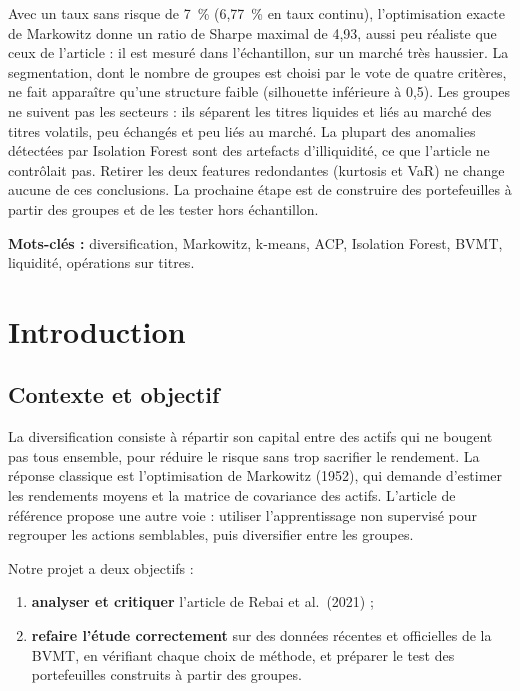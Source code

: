 \documentclass[11pt,a4paper]{article}
\newcommand{\pc}{~\%}
\begin{document}
Avec un taux sans risque de 7\pc{} (6,77\pc{} en taux continu), l'optimisation exacte de Markowitz donne un ratio de Sharpe maximal de 4,93, aussi peu réaliste que ceux de l'article : il est mesuré dans l'échantillon, sur un marché très haussier. La segmentation, dont le nombre de groupes est choisi par le vote de quatre critères, ne fait apparaître qu'une structure faible (silhouette inférieure à 0,5). Les groupes ne suivent pas les secteurs : ils séparent les titres liquides et liés au marché des titres volatils, peu échangés et peu liés au marché. La plupart des anomalies détectées par Isolation Forest sont des artefacts d'illiquidité, ce que l'article ne contrôlait pas. Retirer les deux features redondantes (kurtosis et VaR) ne change aucune de ces conclusions. La prochaine étape est de construire des portefeuilles à partir des groupes et de les tester hors échantillon.

\noindent\textbf{Mots-clés :} diversification, Markowitz, k-means, ACP, Isolation Forest, BVMT, liquidité, opérations sur titres.

\clearpage
\tableofcontents
\clearpage
\listoffigures
\listoftables
\clearpage

\section{Introduction}
\subsection{Contexte et objectif}
La diversification consiste à répartir son capital entre des actifs qui ne bougent pas tous ensemble, pour réduire le risque sans trop sacrifier le rendement. La réponse classique est l'optimisation de Markowitz (1952), qui demande d'estimer les rendements moyens et la matrice de covariance des actifs. L'article de référence propose une autre voie : utiliser l'apprentissage non supervisé pour regrouper les actions semblables, puis diversifier entre les groupes.

Notre projet a deux objectifs :
\begin{enumerate}
  \item \textbf{analyser et critiquer} l'article de Rebai et al.\ (2021) ;
  \item \textbf{refaire l'étude correctement} sur des données récentes et officielles de la BVMT, en vérifiant chaque choix de méthode, et préparer le test des portefeuilles construits à partir des groupes.
\end{enumerate}
\end{document}
